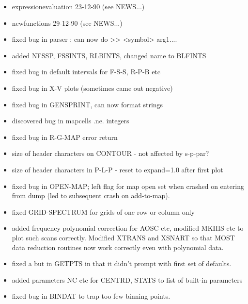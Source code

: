 \documentclass[twoside,11pt]{article}
\renewcommand{\_}{\texttt{\symbol{95}}}
\begin{document}
\begin{itemize}

\item  expression\_evaluation 23-12-90  (see NEWS...)

\item   new\_functions 29-12-90 (see NEWS...)

\item   fixed bug in parser : can now do >> <symbol> arg1....

\item   added N\_FSSP, FSS\_INTS, RLB\_INTS, changed name to BLF\_INTS

\item   fixed bug in default intervals for F-S-S, R-P-B etc
\item   fixed bug in X-V plots (sometimes came out negative)

\item   fixed bug in GEN\_SPRINT, can now format strings

\item   discovered bug in map\_cells .ne. integers

\item   fixed bug in R-G-MAP error return

\item  size of header characters on CONTOUR - not affected by s-p-par?
\item  size of header characters in P-L-P   - reset to expand=1.0 after first plot

\item   fixed bug in OPEN-MAP; left flag for map open set when crashed on entering
  from dump (led to subsequent crash on add-to-map).

\item   fixed GRID-SPECTRUM for grids of one row or column only

\item   added frequency polynomial correction for AOSC etc, modified MKHIS etc
  to plot such scans correctly. Modified XTRANS and XSNART so that MOST
  data reduction routines now work correctly even with polynomial data.

\item   fixed a but in GETPTS in that it didn't prompt with first set of defaults.

\item   added parameters NC etc for CENTRD, STATS to list of built-in parameters

\item   fixed bug in BINDAT to trap too few binning points.

\end{itemize}
\end{document}
